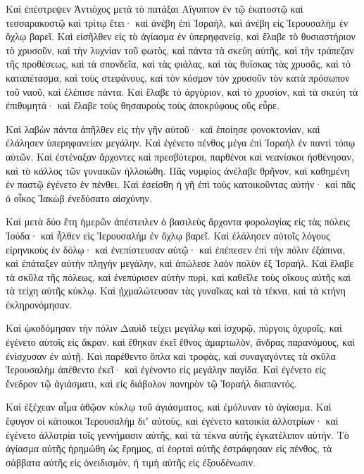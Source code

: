 {\par }{\PP {}Καὶ ἐπέστρεψεν Ἀντιόχος μετὰ τὸ πατάξαι Αἴγυπτον ἐν τῷ ἑκατοστῷ καὶ τεσσαρακοστῷ καὶ τρίτῳ ἔτει· καὶ ἀνέβη ἐπὶ Ἰσραὴλ, καὶ ἀνέβη εἰς Ἱερουσαλὴμ ἐν ὄχλῳ βαρεῖ.
Καὶ εἰσῆλθεν εἰς τὸ ἁγίασμα ἐν ὑπερηφανείᾳ, καὶ ἔλαβε τὸ θυσιαστήριον τὸ χρυσοῦν, καὶ τὴν λυχνίαν τοῦ φωτὸς, καὶ πάντα τὰ σκεύη αὐτῆς,
καὶ τὴν τράπεζαν τῆς προθέσεως, καὶ τὰ σπονδεῖα, καὶ τὰς φιάλας, καὶ τὰς θυΐσκας τὰς χρυσᾶς, καὶ τὸ καταπέτασμα, καὶ τοὺς στεφάνους, καὶ τὸν κόσμον τὸν χρυσοῦν τὸν κατὰ πρόσωπον τοῦ ναοῦ, καὶ ἐλέπισε πάντα.
Καὶ ἔλαβε τὸ ἀργύριον, καὶ τὸ χρυσίον, καὶ τὰ σκεύη τὰ ἐπιθυμητά· καὶ ἔλαβε τοὺς θησαυροὺς τοὺς ἀποκρύφους οὓς εὗρε.
\par }{\PP {}Καὶ λαβὼν πάντα ἀπῆλθεν εἰς τὴν γῆν αὐτοῦ· καὶ ἐποίησε φονοκτονίαν, καὶ ἐλάλησεν ὑπερηφανείαν μεγάλην.
Καὶ ἐγένετο πένθος μέγα ἐπὶ Ἰσραὴλ ἐν παντὶ τόπῳ αὐτῶν.
Καὶ ἐστέναξαν ἄρχοντες καὶ πρεσβύτεροι, παρθένοι καὶ νεανίσκοι ἠσθένησαν, καὶ τὸ κάλλος τῶν γυναικῶν ἠλλοιώθη.
Πᾶς νυμφίος ἀνέλαβε θρῆνον, καὶ καθημένη ἐν παστῷ ἐγένετο ἐν πένθει.
Καὶ ἐσείσθη ἡ γῆ ἐπὶ τοὺς κατοικοῦντας αὐτήν· καὶ πᾶς ὁ οἶκος Ἰακὼβ ἐνεδύσατο αἰσχύνην.
\par }{\PP {}Καὶ μετὰ δύο ἔτη ἡμερῶν ἀπέστειλεν ὁ βασιλεὺς ἄρχοντα φορολογίας εἰς τὰς πόλεις Ἰούδα· καὶ ἦλθεν εἰς Ἱερουσαλὴμ ἐν ὄχλῳ βαρεῖ.
Καὶ ἐλάλησεν αὐτοῖς λόγους εἰρηνικοὺς ἐν δόλῳ· καὶ ἐνεπίστευσαν αὐτῷ· καὶ ἐπέπεσεν ἐπὶ τὴν πόλιν ἐξάπινα, καὶ ἐπάταξεν αὐτὴν πληγὴν μεγάλην, καὶ ἀπώλεσε λαὸν πολὺν ἐξ Ἰσραήλ.
Καὶ ἔλαβε τὰ σκῦλα τῆς πόλεως, καὶ ἐνεπύρισεν αὐτὴν πυρὶ, καὶ καθεῖλε τοὺς οἴκους αὐτῆς καὶ τὰ τείχη αὐτῆς κύκλῳ.
Καὶ ᾐχμαλώτευσαν τὰς γυναῖκας καὶ τὰ τέκνα, καὶ τὰ κτήνη ἐκληρονόμησαν.
\par }{\PP {}Καὶ ᾠκοδόμησαν τὴν πόλιν Δαυὶδ τείχει μεγάλῳ καὶ ἰσχυρῷ, πύργοις ὀχυροῖς, καὶ ἐγένετο αὐτοῖς εἰς ἄκραν.
καὶ ἔθηκαν ἐκεῖ ἔθνος ἁμαρτωλὸν, ἄνδρας παρανόμους, καὶ ἐνίσχυσαν ἐν αὐτῇ.
Καὶ παρέθεντο ὅπλα καὶ τροφὰς, καὶ συναγαγόντες τὰ σκῦλα Ἱερουσαλὴμ ἀπέθεντο ἐκεῖ· καὶ ἐγένοντο εἰς μεγάλην παγίδα.
Καὶ ἐγένετο εἰς ἔνεδρον τῷ ἁγιάσματι, καὶ εἰς διάβολον πονηρὸν τῷ Ἰσραὴλ διαπαντός.
\par }{\PP {}Καὶ ἐξέχεαν αἷμα ἀθῷον κύκλῳ τοῦ ἁγιάσματος, καὶ ἐμόλυναν τὸ ἁγίασμα.
Καὶ ἔφυγον οἱ κάτοικοι Ἱερουσαλὴμ διʼ αὐτοὺς, καὶ ἐγένετο κατοικία ἀλλοτρίων· καὶ ἐγένετο ἀλλοτρία τοῖς γεννήμασιν αὐτῆς, καὶ τὰ τέκνα αὐτῆς ἐγκατέλιπον αὐτήν.
Τὸ ἁγίασμα αὐτῆς ἠρημώθη ὡς ἔρημος, αἱ ἑορταὶ αὐτῆς ἐστράφησαν εἰς πένθος, τὰ σάββατα αὐτῆς εἰς ὀνειδισμὸν, ἡ τιμὴ αὐτῆς εἱς ἐξουδένωσιν.
}
